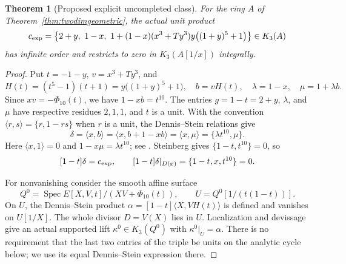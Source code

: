 \documentclass[11pt,a4paper]{article}
\newtheorem{theorem}{Theorem}[section]
\theoremstyle{remark}
\newcommand{\Spec}{\operatorname{Spec}}
\begin{document}
\begin{theorem}[Proposed explicit uncompleted class]
\label{thm:twodimexplicitgeometric}
For the ring $A$ of Theorem~\ref{thm:twodimgeometric}, the actual
unit product
\begin{equation}\label{eq:twodimexplicitgeometric}
 c_{\rm exp}=\left\{2+y,\ 1-x,\
 1+(1-x)(x^3+Ty^3)y\bigl((1+y)^5+1\bigr)\right\}\in K_3(A)
\end{equation}
has infinite order and restricts to zero in $K_3(A[1/x])$ integrally.
\end{theorem}

\begin{proof}
Put $t=-1-y$, $v=x^3+Ty^3$, and
\[
 H(t)=(t^5-1)(t+1)=y\bigl((1+y)^5+1\bigr),\quad
 b=vH(t),\quad \lambda=1-x,\quad \mu=1+\lambda b.
\]
Since $xv=-\Phi_{10}(t)$, we have $1-xb=t^{10}$.
The entries $g=1-t=2+y$, $\lambda$, and $\mu$ have respective
residues $2,1,1$, and $t$ is a unit. With the convention
$\langle r,s\rangle=\{r,1-rs\}$ when $r$ is a unit,
the Dennis--Stein relations give
\[
 \delta=\langle x,b\rangle
 =\langle x,b+1-xb\rangle=\langle x,\mu\rangle
 =\{\lambda t^{10},\mu\}.
\]
Here $\langle x,1\rangle=0$ and $1-x\mu=\lambda t^{10}$;
see \cite[Chapter~III, Definition~5.11 and Exercise~5.6]{Weibel}.
Steinberg gives $\{1-t,t^{10}\}=0$, so
\begin{equation}\label{eq:twodimexplicitDS}
 [1-t]\delta=c_{\rm exp},\qquad
 [1-t]\delta|_{D(x)}=\{1-t,x,t^{10}\}=0.
\end{equation}

For nonvanishing consider the smooth affine surface
\[
 Q^0=\Spec E[X,V,t]/(XV+\Phi_{10}(t)),\qquad
 U=Q^0[1/(t(1-t))].
\]
On $U$, the Dennis--Stein product
$\alpha=[1-t]\langle X,VH(t)\rangle$ is defined and vanishes
on $U[1/X]$. The whole divisor $D=V(X)$ lies in $U$.
Localization and devissage give an actual supported lift
$\kappa^0\in K_3(Q^0)$ with $\kappa^0|_U=\alpha$.
There is no requirement that the last two entries of the triple
be units on the analytic cycle below; we use its equal
Dennis--Stein expression there.


\end{proof}
\end{document}
